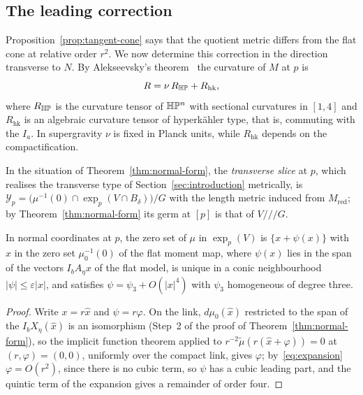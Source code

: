 \subsection{The leading correction}
\label{subsec:leading}

Proposition~\ref{prop:tangent-cone} says that the quotient metric differs from the flat cone at
relative order $r^2$. We now determine this
correction in the direction transverse to $N$. By Alekseevsky's theorem~\cite{Alekseevsky:1968} the
curvature of $M$ at $p$ is
\begin{equation}
 R=\nu\,R_{\mathbb H\mathbb P}+R_{\mathrm{hk}},
 \label{eq:curvature-split}
\end{equation}
where $R_{\mathbb H\mathbb P}$ is the curvature tensor of $\mathbb H\mathbb P^n$ with sectional curvatures in
$[1,4]$ and $R_{\mathrm{hk}}$ is an algebraic curvature tensor of hyperk\"ahler type, that is, commuting
with the $I_a$. In supergravity $\nu$ is fixed in Planck units, while $R_{\mathrm{hk}}$ depends on the
compactification.

In the situation of Theorem~\ref{thm:normal-form}, the \emph{transverse slice} at $p$, which realises the
transverse type of Section~\ref{sec:introduction} metrically, is
$\mathcal Y_p=\bigl(\mu^{-1}(0)\cap\exp_p(V\cap B_\delta)\bigr)/G$ with the length metric induced from
$M_{\mathrm{red}}$; by Theorem~\ref{thm:normal-form} its germ at $[p]$ is that of $V/\!/\!/G$.

\begin{lemma}\label{lem:zero-graph}
In normal coordinates at $p$, the zero set of $\mu$ in $\exp_p(V)$ is $\{x+\psi(x)\}$ with $x$ in the zero
set $\mu_0^{-1}(0)$ of the flat moment map, where $\psi(x)$ lies in the span of the vectors $I_bA_\eta x$ of the flat model,
is unique in a conic neighbourhood $|\psi|\leq\varepsilon|x|$, and satisfies $\psi=\psi_3+O(|x|^4)$ with $\psi_3$
homogeneous of degree three.
\end{lemma}

\begin{proof}
Write $x=r\hat x$ and $\psi=r\varphi$. On the link, $d\mu_0(\hat x)$ restricted to the span of the
$I_bX_\eta(\hat x)$ is an isomorphism (Step~2 of the proof of Theorem~\ref{thm:normal-form}), so the
implicit function theorem applied to $r^{-2}\widetilde\mu(r(\hat x+\varphi))=0$ at $(r,\varphi)=(0,0)$, uniformly
over the compact link, gives $\varphi$; by~\eqref{eq:expansion} $\varphi=O(r^2)$, since there is no cubic term, so
$\psi$ has a cubic leading part, and the quintic term of the expansion gives a remainder of order four.
\end{proof}

